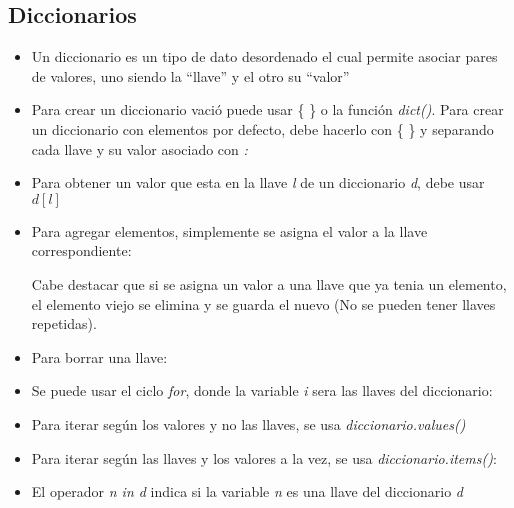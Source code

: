 \subsection*{Diccionarios}

\begin{itemize}
    \item Un diccionario es un tipo de dato desordenado el cual permite asociar pares de valores, uno siendo la ``llave'' y el otro su ``valor''
    
    \item Para crear un diccionario vació puede usar \{ \} o la función \textit{dict()}. Para crear un diccionario con elementos por defecto, debe hacerlo con \{ \} y separando cada llave y su valor asociado con \textit{:}

    \item Para obtener un valor que esta en la llave \textit{l} de un diccionario \textit{d}, debe usar $d[l]$

    \item Para agregar elementos, simplemente se asigna el valor a la llave correspondiente:

    Cabe destacar que si se asigna un valor a una llave que ya tenia un elemento, el elemento viejo se elimina y se guarda el nuevo (No se pueden tener llaves repetidas).

    \item Para borrar una llave:

    \item Se puede usar el ciclo \textit{for}, donde la variable \textit{i} sera las llaves del diccionario:

    \item Para iterar según los valores y no las llaves, se usa \textit{diccionario.values()}

    \item Para iterar según las llaves y los valores a la vez, se usa \textit{diccionario.items()}:

    \item El operador \textit{n in d} indica si la variable \textit{n} es una llave del diccionario \textit{d}
\end{itemize}
